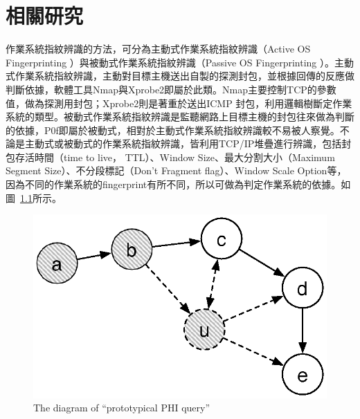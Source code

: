 \renewcommand\thetable{\arabic{chapter}-\arabic{table}}
\renewcommand{\theequation}{\arabic{chapter}-\arabic{equation}}
\chapter{相關研究}

作業系統指紋辨識的方法，可分為主動式作業系統指紋辨識（Active OS Fingerprinting ）與被動式作業系統指紋辨識（Passive OS Fingerprinting ）。主動式作業系統指紋辨識，主動對目標主機送出自製的探測封包，並根據回傳的反應做判斷依據，軟體工具Nmap與Xprobe2即屬於此類。Nmap主要控制TCP的參數值，做為探測用封包；Xprobe2則是著重於送出ICMP 封包，利用邏輯樹斷定作業系統的類型。被動式作業系統指紋辨識是監聽網路上目標主機的封包往來做為判斷的依據，P0f即屬於被動式，相對於主動式作業系統指紋辨識較不易被人察覺。不論是主動式或被動式的作業系統指紋辨識，皆利用TCP/IP堆疊進行辨識，包括封包存活時間（time to live， TTL）、Window Size、最大分割大小（Maximum Segment Size）、不分段標記（Don't Fragment flag）、Window Scale Option等，因為不同的作業系統的fingerprint有所不同，所以可做為判定作業系統的依據。如圖~\ref{fig:PHI}所示。


\begin{figure}[hbtp]
  \begin{center}
    \includegraphics[width=1.0\textwidth]{figures/dyna_rm.eps}
    \caption{The diagram of ``prototypical PHI query''} 
    \label{fig:PHI}
  \end{center}
\end{figure}
